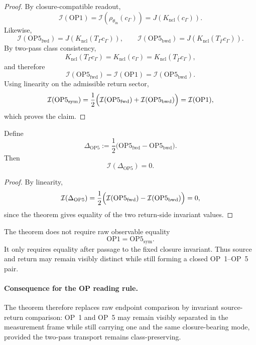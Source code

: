 \begin{proof}
By closure-compatible readout,
\[
\mathcal{I}(\mathrm{OP1})
=
\mathcal{I}\!\left(\rho_{\theta_{\mathrm{in}}}(c_{\Gamma})\right)
=
J(K_{\mathrm{ncl}}(c_{\Gamma})).
\]
Likewise,
\[
\mathcal{I}(\mathrm{OP5}_{\mathrm{fwd}})
=
J(K_{\mathrm{ncl}}(T_{\Gamma}c_{\Gamma})),
\qquad
\mathcal{I}(\mathrm{OP5}_{\mathrm{bwd}})
=
J(K_{\mathrm{ncl}}(T_{\overline{\Gamma}}c_{\Gamma})).
\]
By two-pass class consistency,
\[
K_{\mathrm{ncl}}(T_{\Gamma}c_{\Gamma})
=
K_{\mathrm{ncl}}(c_{\Gamma})
=
K_{\mathrm{ncl}}(T_{\overline{\Gamma}}c_{\Gamma}),
\]
and therefore
\[
\mathcal{I}(\mathrm{OP5}_{\mathrm{fwd}})
=
\mathcal{I}(\mathrm{OP1})
=
\mathcal{I}(\mathrm{OP5}_{\mathrm{bwd}}).
\]
Using linearity on the admissible return sector,
\[
\mathcal{I}(\mathrm{OP5}_{\mathrm{sym}})
=
\frac12\Bigl(
\mathcal{I}(\mathrm{OP5}_{\mathrm{fwd}})
+
\mathcal{I}(\mathrm{OP5}_{\mathrm{bwd}})
\Bigr)
=
\mathcal{I}(\mathrm{OP1}),
\]
which proves the claim.
\end{proof}

\begin{corollary}
Define
\[
\Delta_{\mathrm{OP5}}
:=
\frac12\bigl(\mathrm{OP5}_{\mathrm{fwd}}-\mathrm{OP5}_{\mathrm{bwd}}\bigr).
\]
Then
\[
\mathcal{I}(\Delta_{\mathrm{OP5}})=0.
\]
\end{corollary}

\begin{proof}
By linearity,
\[
\mathcal{I}(\Delta_{\mathrm{OP5}})
=
\frac12\Bigl(
\mathcal{I}(\mathrm{OP5}_{\mathrm{fwd}})
-
\mathcal{I}(\mathrm{OP5}_{\mathrm{bwd}})
\Bigr)=0,
\]
since the theorem gives equality of the two return-side invariant values.
\end{proof}

\begin{remark}
The theorem does not require raw observable equality
\[
\mathrm{OP1}=\mathrm{OP5}_{\mathrm{sym}}.
\]
It only requires equality after passage to the fixed closure invariant. Thus source and return may remain visibly distinct while still forming a closed OP~1--OP~5 pair.
\end{remark}

\paragraph{Consequence for the OP reading rule.}
The theorem therefore replaces raw endpoint comparison by invariant source-return comparison: OP~1 and OP~5 may remain visibly separated in the measurement frame while still carrying one and the same closure-bearing mode, provided the two-pass transport remains class-preserving.

